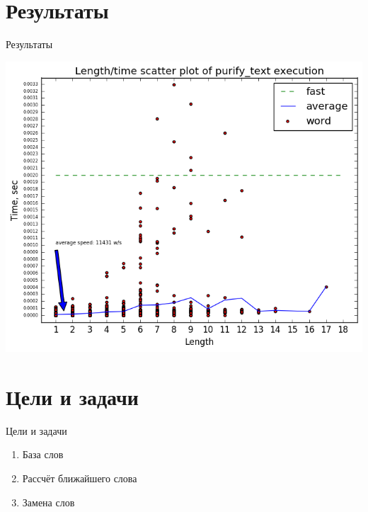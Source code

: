 \documentclass{beamer}
\begin{document}
\section{Результаты}
\begin{frame}[t]{Результаты}
    \begin{center}
        \includegraphics[width=0.70\linewidth]{length_time_plot.png}
    \end{center}
\end{frame}

\section{Цели и задачи}
\begin{frame}[<+->]{Цели и задачи}
    \begin{enumerate}
        \item База слов
        \item Рассчёт ближайшего слова
        \item Замена слов
    \end{enumerate}
\end{frame}
\end{document}
